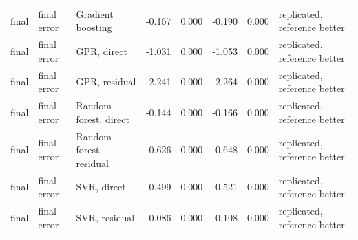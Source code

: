 \begin{table}[t]
\begin{tabular}{lllrrrrl}
    final & final error & Gradient boosting & -0.167 & 0.000 & -0.190 & 0.000 & replicated, reference better \\
    final & final error & GPR, direct & -1.031 & 0.000 & -1.053 & 0.000 & replicated, reference better \\
    final & final error & GPR, residual & -2.241 & 0.000 & -2.264 & 0.000 & replicated, reference better \\
    final & final error & Random forest, direct & -0.144 & 0.000 & -0.166 & 0.000 & replicated, reference better \\
    final & final error & Random forest, residual & -0.626 & 0.000 & -0.648 & 0.000 & replicated, reference better \\
    final & final error & SVR, direct & -0.499 & 0.000 & -0.521 & 0.000 & replicated, reference better \\
    final & final error & SVR, residual & -0.086 & 0.000 & -0.108 & 0.000 & replicated, reference better \\
    \bottomrule
  \end{tabular}
\end{table}
